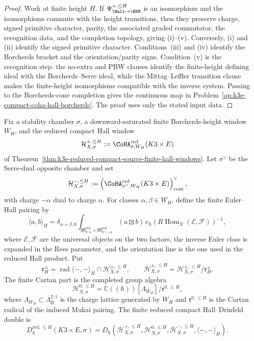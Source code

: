 \begin{proof}
Work at finite height \(H\). If
\(\Psi^{+,\leq H}_{\Hall\to\BKM}\) is an isomorphism and the
isomorphisms commute with the height transitions, then they preserve
charge, signed primitive character, parity, the associated graded
commutator, the recognition data, and the completion topology, giving
\textup{(i)}--\textup{(v)}. Conversely,
\textup{(i)} and \textup{(ii)} identify the signed primitive character.
Conditions~\textup{(iii)} and \textup{(iv)} identify the Borcherds
bracket and the orientation/parity signs. Condition~\textup{(v)} is the
recognition step: the no-extra and PBW clauses identify the finite-height
defining ideal with the Borcherds--Serre ideal, while the
Mittag--Leffler transition clause makes the finite-height isomorphisms
compatible with the inverse system. Passing to the Borcherds-cone
completion gives the continuous map in
Problem~\ref{op:k3e-compact-coha-hall-borcherds}. The proof uses only
the stated input data.
\end{proof}

\begin{definition}
\label{def:k3e-finite-compact-hall-drinfeld-double}
Fix a stability chamber \(\sigma\), a downward-saturated finite
Borcherds-height window \(W_H\), and the reduced compact Hall window
\[
 \mathcal H^{+,\leq H}_{X,\sigma}
 :=
 \CoHA_{\sigma,W_H}^{\mathrm{red}}(K3\times E)
\]
of Theorem~\ref{thm:k3e-reduced-compact-source-finite-hall-windows}.
Let \(\sigma^\vee\) be the Serre-dual opposite chamber and set
\[
 \mathcal H^{-,\leq H}_{X,\sigma}
 :=
 \left(\CoHA_{\sigma^\vee,W_H}^{\mathrm{red}}(K3\times E)\right)^\vee_{\mathrm{cont}},
\]
with charge \(-\alpha\) dual to charge \(\alpha\). For classes
\(\alpha,\beta\in W_H\), define the finite Euler--Hall pairing by
\[
 \langle a,b\rangle_H
 =
 \delta_{\alpha+\beta,0}
 \int_{\mathfrak M_{\sigma,\alpha}^{\mathrm{red}}
 \times
 \mathfrak M_{\sigma^\vee,-\alpha}^{\mathrm{red}}}
 (a\boxtimes b)\,
 e_\hbar\!\left(
 R\!\operatorname{Hom}_X(\mathcal E,\mathcal F)
 \right)^{-1},
\]
where \(\mathcal E,\mathcal F\) are the universal objects on the two
factors, the inverse Euler class is expanded in the Rees parameter, and
the orientation line is the one used in the reduced Hall product. Put
\[
 \mathfrak r_H^\pm=\operatorname{rad}\langle-,-\rangle_H\cap
 \mathcal H^{\pm,\leq H}_{X,\sigma},\qquad
 \overline{\mathcal H}^{\pm,\leq H}_{X,\sigma}
 =
 \mathcal H^{\pm,\leq H}_{X,\sigma}/\mathfrak r_H^\pm .
\]
The finite Cartan part is the completed group algebra
\[
 \mathcal H^{0,\leq H}_{X,\sigma}
 =
 \mathbb C((\hbar))[\Lambda_{W_H}]
 /\mathfrak r^{0,\leq H},
\]
where \(\Lambda_{W_H}\subset \Lambda_{\mathrm{II}}^{2,1}\) is the
charge lattice generated by \(W_H\) and \(\mathfrak r^{0,\leq H}\) is
the Cartan radical of the induced Mukai pairing. The finite reduced
compact Hall--Drinfeld double is
\[
 D^{\mathrm{red},\leq H}_{\hbar}(K3\times E,\sigma)
 =
 D_\hbar\!\left(
 \overline{\mathcal H}^{+,\leq H}_{X,\sigma},
 \mathcal H^{0,\leq H}_{X,\sigma},
 \overline{\mathcal H}^{-,\leq H}_{X,\sigma},
 \langle-,-\rangle_H
 \right).
\]
\end{definition}

